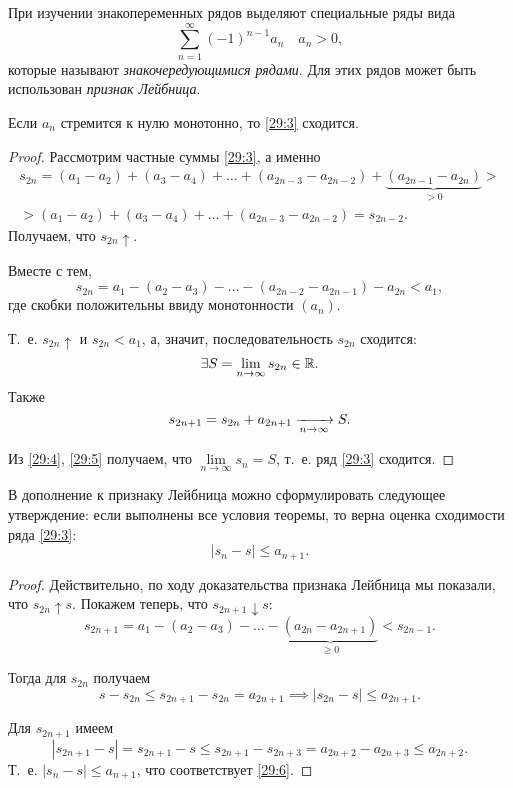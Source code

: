 \documentclass[../../main.tex]{subfiles}
\begin{document}
	При изучении знакопеременных рядов выделяют специальные ряды вида
	\begin{equation}
		\sum_{n = 1}^\infty (-1)^{n - 1}a_n\quad a_n > 0,
		\label{29:3}
	\end{equation}
	которые называют \emph{знакочередующимися рядами}. 
	Для этих рядов может быть использован \emph{признак Лейбница}.
	\begin{thm}
		\label{29:leibnitz}
		Если $a_n$ стремится к нулю монотонно, то \eqref{29:3} сходится.
	\end{thm}
	\begin{proof}
		Рассмотрим частные суммы \eqref{29:3}, а именно
		\begin{gather*}
			s_{2n} = (a_1 - a_2) + (a_3 - a_4) + \ldots + (a_{2n - 3} - a_{2n - 2}) + 
			\underbrace{(a_{2n - 1} - a_{2n})}_{> 0} >\\
			> (a_1 - a_2) + (a_3 - a_4) + \ldots + (a_{2n - 3} - a_{2n - 2}) = s_{2n - 
			2}.
		\end{gather*}
		Получаем, что $s_{2n}\uparrow$.
		
		Вместе с тем,
		\[s_{2n} = a_1 - (a_{2} - a_3) - \ldots - (a_{2n - 2} - a_{2n - 1}) - a_{2n} 
		< a_1,\]
		где скобки положительны ввиду монотонности $(a_n)$.
		
		Т.~е. $s_{2n}\uparrow$ и $s_{2n} < a_1$, а, 
		значит, последовательность $s_{2n}$ сходится:
		\begin{equation}
			\exists S = \lim\limits_{n\to\infty}s_{2n}\in\mathbb{R}.
			\label{29:4}
		\end{equation}
		Также 
		\begin{equation}
			s_{2n + 1} = s_{2n} + a_{2n + 1}
			\xrightarrow[n\to\infty]{} S.
			\label{29:5}
		\end{equation}
		
		Из \eqref{29:4}, \eqref{29:5} получаем, что $\lim\limits_{n\to\infty} s_n = 
		S$, 
		т.~е. ряд 
		\eqref{29:3} сходится.
	\end{proof}

	В дополнение к признаку Лейбница можно 
	сформулировать следующее утверждение: если 
	выполнены все условия теоремы, то верна
	оценка сходимости ряда \eqref{29:3}:
	\begin{equation}
		\left|s_n - s\right|\leq a_{n + 1}.
		\label{29:6}
	\end{equation}
	\begin{proof}
		Действительно, по ходу доказательства признака Лейбница мы показали, что 
		$s_{2n}\uparrow s$. 
		Покажем теперь, что $s_{2n + 1}\downarrow s$:
		\[s_{2n + 1} = a_1 - (a_2 - a_3) - \ldots - \underbrace{(a_{2n} - a_{2n + 
		1})}_{\ge 0} < s_{2n - 
		1}.\]
		
		Тогда для $s_{2n}$ получаем
		\[s - s_{2n} \leq s_{2n + 1} - s_{2n} = a_{2n + 1}
		\implies |s_{2n} - s|\leq a_{2n + 1}.\]
		
		Для $s_{2n + 1}$ имеем
		\[|s_{2n + 1} - s| = s_{2n + 1} - s 
		\leq s_{2n + 1} - s_{2n + 3} = 
		a_{2n + 2} - a_{2n + 3}\leq a_{2n + 2}.\]
		Т.~е. $|s_n - s|\leq a_{n + 1}$, что соответствует \eqref{29:6}.
	\end{proof}
\end{document}
